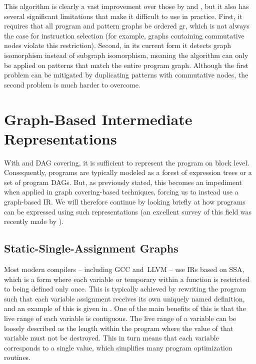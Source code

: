 This algorithm is clearly a vast improvement over those by
\citeauthor{Ullmann1976} and \citeauthor{Cordella2001}, but it also has several
significant limitations that make it difficult to use in practice.
%
First, it
requires that all \gls{program} and \glspl{pattern graph} be \gls{ordered gr},
which is not always the case for \gls{instruction selection} (for example,
\glspl{graph} containing commutative \glspl{node} violate this
restriction).
%
Second, in its current form it detects \gls{graph isomorphism}
instead of \gls{subgraph isomorphism}, meaning the algorithm can only be applied
on \glspl{pattern} that match the entire \gls{program graph}.
%
Although the first
problem can be mitigated by duplicating \glspl{pattern} with commutative
\glspl{node}, the second problem is much harder to overcome.


\section{Graph-Based Intermediate Representations}

With  and \gls{DAG covering}, it is sufficient to
represent the \gls{program} on \gls{block} level.
%
Consequently, \glspl{program}
are typically modeled as a \gls{forest} of \glspl{expression tree} or a set of
\glspl{program DAG}.
%
But, as previously stated, this becomes an impediment when
applied in \gls{graph covering}-based techniques, forcing us to instead use a
\gls{graph}-based \glsdesc{IR}.
%
We will therefore continue by looking briefly at
how \glspl{program} can be expressed using such representations (an excellent
survey of this field was recently made by \textcite{Stanier2013}).


\subsection{Static-Single-Assignment Graphs}

Most modern \glspl{compiler} -- including \gls{GCC} and~\gls{LLVM} -- use
\glspl{IR} based on \gls{SSA}, which is a form where each variable or
\gls{temporary} within a \gls{function} is restricted to being defined only
once.
%
This is typically achieved by rewriting the \gls{program} such that each
variable assignment receives its own uniquely named definition, and an example
of this is given in .
%
One of the main benefits of this is
that the \gls{live range} of each variable is contiguous.
%
The \gls{live range}
of a variable can be loosely described as the length within the \gls{program}
where the value of that variable must not be destroyed.
%
This in turn means that each variable corresponds to a single value, which
simplifies many \gls{program} optimization routines.


